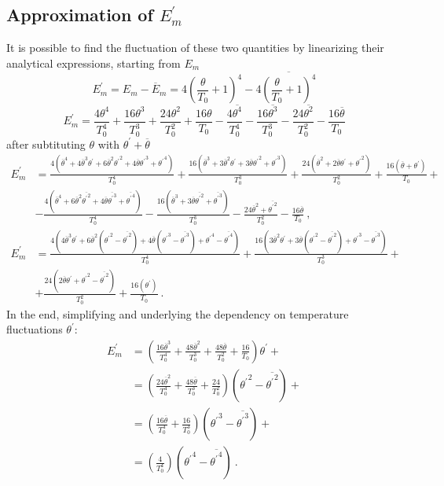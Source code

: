 \documentclass[10pt]{article}
\def\lp{\left(}
\def\rp{\right)}
\def\tp{\overline{{\theta^\prime}^2}}
\def\tm{\overline{\theta}}
\def\tr{{\theta^\prime}}
\begin{document}
\subsection*{Approximation of $E_m^\prime$}
It is possible to find the fluctuation of these two quantities by linearizing their analytical expressions, starting from $E_m$
\begin{equation*}
E_m^\prime  = E_m - \overline{E}_m = 4 {\lp \frac{\theta}{T_0} + 1\rp }^4 - 4\overline{ {\lp \frac{\theta}{T_0} + 1\rp }^4}
\end{equation*}
\begin{equation*}
E_m^\prime  = \frac{4 \theta^4}{T_0^4} + \frac{16 \theta^3}{T_0^3} + \frac{24 \theta^2}{T_0^2} + \frac{16\theta}{T_0}  
            - \frac{4 \overline{\theta^4}}{T_0^4} - \frac{16 \overline{\theta^3}}{T_0^3} - \frac{24 \overline{\theta^2}}{T_0^2} - \frac{16\tm}{T_0}  
\end{equation*}
after subtituting $\theta$ with $\tr+\tm$
\begin{equation*}
\begin{split}
E_m^\prime & = \frac{4 (\tm^4 + 4\tm^3 \tr + 6\tm^2 \tr^2+4\tm\tr^3+\tr^4)}{T_0^4} + \frac{16 (\tm^3 + 3\tm^2\tr+3\tm\tr^2+\tr^3)}{T_0^3} + \frac{24 (\tm^2+2\tm\tr+\tr^2)}{T_0^2} + \frac{16(\tm+\tr)}{T_0} + \\
           & - \frac{4 (\tm^4 + 6\tm^2 \tp +4\tm\overline{\tr^3} + \overline{\tr^4})}{T_0^4} - \frac{16(\tm^3 +3\tm\tp+\overline{\tr^3})}{T_0^3} - \frac{24 \tm^2 + \tp}{T_0^2} - \frac{16\tm}{T_0}  \ ,
\end{split}
\end{equation*}
\begin{equation*}
\begin{split}
E_m^\prime & = \frac{4 (4\tm^3 \tr + 6\tm^2 (\tr^2-\tp)+4\tm(\tr^3-\overline{\tr^3})+\tr^4-\overline{\tr^4})}{T_0^4} + \frac{16 (3\tm^2\tr+3\tm(\tr^2-\tp)+\tr^3-\overline{\tr^3})}{T_0^3} + \\
           & + \frac{24 (2\tm\tr+\tr^2-\tp)}{T_0^2} + \frac{16(\tr)}{T_0}  \ .
\end{split}
\end{equation*}
In the end, simplifying and underlying the dependency on temperature fluctuations $\tr$:
\begin{equation*}
\begin{split}
E_m^\prime & = \lp \frac{16 \tm^3}{T_0^4} + \frac{48 \tm^2}{T_0^3} + \frac{48 \tm}{T_0^2} + \frac{16}{T_0}  \rp \tr + \\
           & = \lp \frac{24 \tm^2}{T_0^4} + \frac{48 \tm}{T_0^3}   + \frac{24}{T_0^2}   \rp (\tr^2 - \tp) + \\
           & = \lp \frac{16 \tm}{T_0^4}   + \frac{16} {T_0^3}   \rp (\tr^3 - \overline{\tr^3}) + \\
           & = \lp \frac{4}{T_0^4}  \rp (\tr^4 - \overline{\tr^4})  \ .
\end{split}
\end{equation*}
\end{document}
